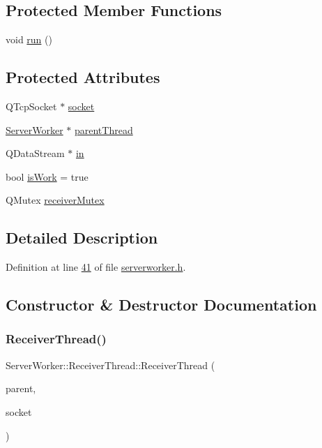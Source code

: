 \subsection*{Protected Member Functions}
\begin{DoxyCompactItemize}
\item 
void \hyperlink{a00193_ac4363547096e15a9a70e588e010855f9}{run} ()
\end{DoxyCompactItemize}
\subsection*{Protected Attributes}
\begin{DoxyCompactItemize}
\item 
Q\+Tcp\+Socket $\ast$ \hyperlink{a00193_a9dde916368513ce6a9548e923d2334fb}{socket}
\item 
\hyperlink{a00185}{Server\+Worker} $\ast$ \hyperlink{a00193_a4fe56856b2917d124163c057319419ac}{parent\+Thread}
\item 
Q\+Data\+Stream $\ast$ \hyperlink{a00193_a15a77c31da23a15968944100e884b88e}{in}
\item 
bool \hyperlink{a00193_a2b37a2d966c912535eb3463bc0d60a22}{is\+Work} = true
\item 
Q\+Mutex \hyperlink{a00193_abd3ff6eaea0f4da20eeb987a57cbda4f}{receiver\+Mutex}
\end{DoxyCompactItemize}


\subsection{Detailed Description}


Definition at line \hyperlink{a00110_source_l00041}{41} of file \hyperlink{a00110_source}{serverworker.\+h}.



\subsection{Constructor \& Destructor Documentation}
\mbox{\label{a00193_a4d4ad81a3aa7b6b71eb8d9345f9b7924}} 
\subsubsection{\texorpdfstring{Receiver\+Thread()}{ReceiverThread()}}
{\footnotesize\ttfamily Server\+Worker\+::\+Receiver\+Thread\+::\+Receiver\+Thread (\begin{DoxyParamCaption}\item[{\hyperlink{a00185}{Server\+Worker} $\ast$}]{parent,  }\item[{Q\+Tcp\+Socket $\ast$}]{socket }\end{DoxyParamCaption})}



